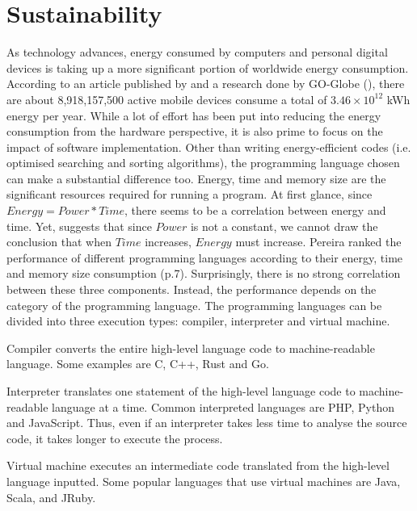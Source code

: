 \section{Sustainability}
\label{Sustainability}
As technology advances, energy consumed by computers and personal digital devices is taking up a more significant portion of worldwide energy consumption. 
According to an article published by  and a research done by GO-Globe (\cite{energy}), there are about 8,918,157,500 active
mobile devices consume a total of $3.46\times 10^{12}$ kWh energy per year.
While a lot of effort has been put into reducing the energy consumption from the hardware perspective,
it is also prime to focus on the impact of software implementation.
Other than writing energy-efficient codes (i.e. optimised searching and sorting algorithms), the programming language 
chosen can make a substantial difference too. Energy, time and memory size are the significant resources required for running a program.
At first glance, since \(Energy = Power * Time\), there seems to be a correlation between energy and time. Yet,
 suggests that since \(Power\) is not a constant, we cannot draw the conclusion that
when \(Time\) increases, \(Energy\) must increase. 
Pereira ranked the performance of different programming languages according to their energy, time and memory size consumption (p.7). 
Surprisingly, there is no strong correlation between these three components. 
Instead, the performance depends on the category of the programming language.
The programming languages can be divided into three execution types: compiler, interpreter and virtual machine.

\begin{description}
    \item Compiler converts the entire high-level language code to machine-readable language. Some examples are C, C++, Rust and Go. 
    \item Interpreter translates one statement of the high-level language code to machine-readable language at a time. Common interpreted languages are PHP, Python and JavaScript.
    Thus, even if an interpreter takes less time to analyse the source code, it takes longer to execute the process.
    \item Virtual machine executes an intermediate code translated from the high-level language inputted. Some popular languages that use virtual machines are Java, Scala, and JRuby.
\end{description}

